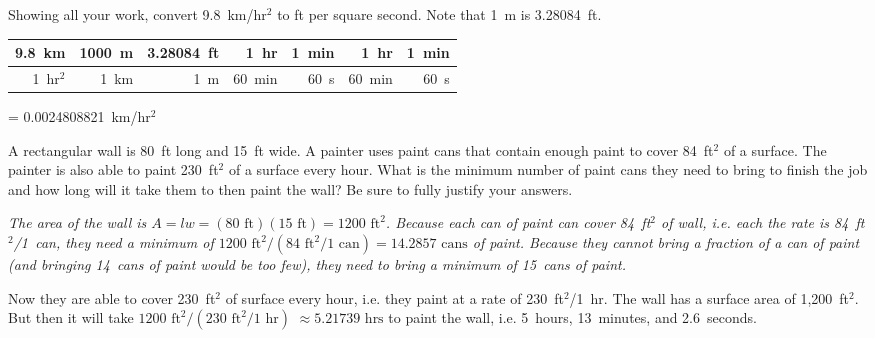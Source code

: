 \documentclass[12pt,letterpaper]{exam}
\begin{document}
\begin{questions}
\newpage
\question[10] Showing all your work, convert 9.8~km/hr$^2$ to ft per square second. Note that 1~m is 3.28084~ft. \pspace

\sol 
	\begin{table}[!ht]
	\centering
	\begin{tabular}{r|r|r|r|r|r|r}
	9.8~km    & 1000~m & 3.28084~ft & 1~hr      & 1~min & 1~hr      & 1~min \\ \hline
	1~hr$^2$ & 1~km     & 1~m           & 60~min  & 60~s & 60~min  & 60~s 
	\end{tabular}
	\pspace= 0.0024808821~km/hr$^2$
	\end{table} 



\newpage
\question[10] A rectangular wall is 80~ft long and 15~ft wide. A painter uses paint cans that contain enough paint to cover 84~ft$^2$ of a surface. The painter is also able to paint 230~ft$^2$ of a surface every hour. What is the minimum number of paint cans they need to bring to finish the job and how long will it take them to then paint the wall? Be sure to fully justify your answers. \pspace

{\itshape
\sol The area of the wall is $A= lw= (80 \text{ ft})(15 \text{ ft})= 1200 \text{ ft}^2$. Because each can of paint can cover 84~ft$^2$ of wall, i.e. each the rate is 84~ft$^2$/1~can, they need a minimum of $1200 \text{ ft}^2/ (84 \text{ ft}^2/1 \text{ can})= 14.2857 \text{ cans}$ of paint. Because they cannot bring a fraction of a can of paint (and bringing 14~cans of paint would be too few), they need to bring a minimum of 15~cans of paint. \pspace

Now they are able to cover 230~ft$^2$ of surface every hour, i.e. they paint at a rate of 230~ft$^2$/1~hr. The wall has a surface area of 1,200~ft$^2$. But then it will take $1200 \text{ ft}^2/(230 \text{ ft}^2/1 \text{ hr})$ $\approx 5.21739 \text{ hrs}$ to paint the wall, i.e. 5~hours, 13~minutes, and 2.6~seconds. 
}


\end{questions}
\end{document}
